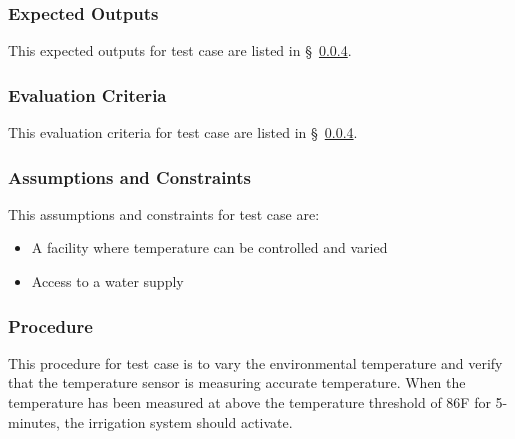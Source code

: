 \subsubsection{Expected Outputs}
\label{loc:TestCaseExpectedOutputs\StsTestSpecID\StsTestCaseID}
% 

This expected outputs for test  case  are listed in \S~\ref{loc:TestCaseProcedure\StsTestSpecID\StsTestCaseID}.

\subsubsection{Evaluation Criteria}
\label{loc:TestCaseEvaluationCriteria\StsTestSpecID\StsTestCaseID}
% 

This evaluation criteria for test  case  are listed in \S~\ref{loc:TestCaseProcedure\StsTestSpecID\StsTestCaseID}.

\subsubsection{Assumptions and Constraints}
\label{loc:TestCaseAssumptions\StsTestSpecID\StsTestCaseID}
% 

This assumptions and constraints for test  case  are:

\begin{itemize}
    \item A facility where temperature can be controlled and varied
    \item Access to a water supply
\end{itemize}

\subsubsection{Procedure}
\label{loc:TestCaseProcedure\StsTestSpecID\StsTestCaseID}
% 

This procedure for test  case  is to vary the environmental temperature and verify that the temperature sensor is measuring accurate temperature.
When the temperature has been measured at above the temperature threshold of 86\degree F for 5-minutes, the irrigation system should activate.

